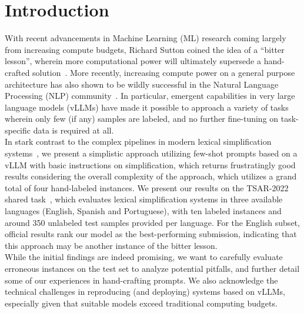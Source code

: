 \documentclass[11pt]{article}
\newcommand{\todo}[1]{\textcolor{red}{TODO: #1}}
\begin{document}
\section{Introduction}
With recent advancements in Machine Learning (ML) research coming largely from increasing compute budgets, Richard Sutton coined the idea of a ``bitter lesson'', wherein more computational power will ultimately supersede a hand-crafted solution~\cite{sutton-2019-bitter}.
More recently, increasing compute power on a general purpose architecture has also shown to be wildly successful in the Natural Language Processing (NLP) community~\cite{vaswani-etal-2017-attention,wei-etal-2022-emergent}.
In particular, emergent capabilities in very large language models (vLLMs) have made it possible to approach a variety of tasks wherein only few (if any) samples are labeled, and no further fine-tuning on task-specific data is required at all.\\
In stark contrast to the complex pipelines in modern lexical simplification systems~\cite{ferres-etal-2017-adaptable,qiang-etal-2020-lexical,stajner-etal-2022-lexical}, we present a simplistic approach utilizing few-shot prompts based on a vLLM with basic instructions on simplification, which returns frustratingly good results considering the overall complexity of the approach, which utilizes a grand total of four hand-labeled instances.
We present our results on the TSAR-2022 shared task~\cite{tsar-2022-findings}, which evaluates lexical simplification systems in three available languages (English, Spanish and Portuguese), with ten labeled instances and around 350 unlabeled test samples provided per language.
For the English subset, official results rank our model as the best-performing submission, indicating that this approach may be another instance of the bitter lesson.\\
While the initial findings are indeed promising, we want to carefully evaluate erroneous instances on the test set to analyze potential pitfalls, and further detail some of our experiences in hand-crafting prompts.
We also acknowledge the technical challenges in reproducing (and deploying) systems based on vLLMs, especially given that suitable models exceed traditional computing budgets.

\end{document}
